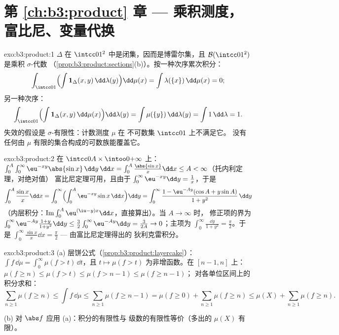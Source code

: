 \section*{第 \ref{ch:b3:product} 章 --- 乘积测度，
富比尼、变量代换}

\begin{solution}{exo:b3:product:1}
$\Delta$ 在 $\intcc01^2$ 中是闭集，因而是博雷尔集，且 $\mathcal
B(\intcc01^2)$ 是乘积 $\sigma$-代数
（\cref{prop:b3:product:sections}(b)）。按一种次序累次积分：
\[
\int_{\intcc01}\Bigl(\int \mathbf 1_\Delta(x,y)
\,\dd\lambda(y)\Bigr)\dd\mu(x)
= \int \lambda(\{x\})\,\dd\mu(x) = 0 ;
\]
另一种次序：
\[
\int_{\intcc01}\Bigl(\int\mathbf
1_\Delta(x,y)\,\dd\mu(x)\Bigr)\dd\lambda(y)
= \int \mu(\{y\})\,\dd\lambda(y) = \int 1\,\dd\lambda = 1 .
\]
失效的假设是 $\sigma$-有限性：计数测度 $\mu$ 在
不可数集 $\intcc01$ 上不满足它。
没有任何由 $\mu$ 有限的集合构成的可数族能覆盖它。
\end{solution}

\begin{solution}{exo:b3:product:2}
在 $\intcc0A\times\intoo0{+\infty}$ 上：
$\int_0^A\int_0^\infty\eu^{-xy}\abs{\sin x}\,\dd y\,\dd x =
\int_0^A\frac{\abs{\sin x}}x\dd x \leq A < \infty$（托内利定理，对绝对值）
富比尼定理可用，且由于
$\int_0^\infty\eu^{-xy}\dd y = \frac1x$，于是
\[
\int_0^A\frac{\sin x}x\dd x
= \int_0^\infty\Bigl(\int_0^A\eu^{-xy}\sin x\,\dd
x\Bigr)\dd y
= \int_0^\infty \frac{1 - \eu^{-Ay}(\cos A + y\sin A)}{1 +
y^2}\,\dd y
\]
（内层积分：$\operatorname{Im}\int_0^A\eu^{(\iu -
y)x}\dd x$，直接算出）。当 $A \to \infty$ 时，
修正项的界为 $\int_0^\infty\eu^{-Ay}\frac{1 +
y}{1 + y^2}\dd y \leq \frac32\int_0^\infty\eu^{-Ay}\dd y =
\frac3{2A} \to 0$；主项为
$\int_0^\infty\frac{\dd y}{1+y^2} = \frac\pi2$。于是
$\int_0^\infty\frac{\sin x}x\dd x = \frac\pi2$ --- 由富比尼定理得出的
狄利克雷积分。
\end{solution}

\begin{solution}{exo:b3:product:3}
(a) 层饼公式（\cref{prop:b3:product:layercake}）：$\int
f\,\dd\mu = \int_0^\infty\mu(f > t)\,\dd t$，且 $t \mapsto
\mu(f > t)$ 为非增函数。在 $[n-1, n]$ 上：$\mu(f \geq n)
\leq \mu(f > t) \leq \mu(f > n - 1) \leq \mu(f \geq n - 1)$；
对各单位区间上的积分求和：
\[
\sum_{n\geq1}\mu(f \geq n) \leq \int f\,\dd\mu \leq
\sum_{n\geq1}\mu(f \geq n - 1) = \mu(f \geq 0) +
\sum_{n\geq1}\mu(f\geq n) \leq \mu(X) + \sum_{n\geq1}\mu(f\geq
n).
\]

(b) 对 $\abs f$ 应用 (a)：积分的有限性与
级数的有限性等价（多出的 $\mu(X)$ 有限）。
\end{solution}

